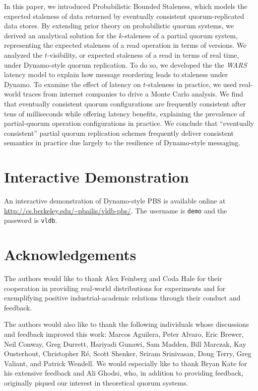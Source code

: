 \documentclass{vldb}
\begin{document}
In this paper, we introduced Probabilistic Bounded Staleness, which
models the expected staleness of data returned by eventually
consistent quorum-replicated data stores.  By extending prior theory
on probabilistic quorum systems, we derived an analytical solution for
the $k$-staleness of a partial quorum system, representing the
expected staleness of a read operation in terms of versions.  We
analyzed the $t$-visibility, or expected staleness of a read in terms
of real time, under Dynamo-style quorum replication.  To do so, we
developed the the \textit{WARS} latency model to explain how message
reordering leads to staleness under Dynamo.  To examine the effect of
latency on $t$-staleness in practice, we used real-world traces from
internet companies to drive a Monte Carlo analysis.  We find that
eventually consistent quorum configurations are frequently consistent
after tens of milliseconds while offering latency benefits, explaining
the prevalence of partial-quorum operation configurations in practice.
We conclude that ``eventually consistent'' partial quorum replication
schemes frequently deliver consistent semantics in practice due
largely to the resilience of Dynamo-style messaging.

\section*{Interactive Demonstration}

An interactive demonstration of Dynamo-style PBS is available online
at \url{http://cs.berkeley.edu/~pbailis/vldb-pbs/}.  The username is
\texttt{demo} and the password is \texttt{vldb}.

\section*{Acknowledgements}

The authors would like to thank Alex Feinberg and Coda Hale for their
cooperation in providing real-world distributions for experiments and
for exemplifying positive industrial-academic relations through their
conduct and feedback.

The authors would also like to thank the following individuals whose
discussions and feedback improved this work: Marcos Aguilera, Peter
Alvaro, Eric Brewer, Neil Conway, Greg Durrett, Hariyadi Gunawi, Sam
Madden, Bill Marczak, Kay Ousterhout, Christopher R\'e, Scott Shenker,
Sriram Srinivasan, Doug Terry, Greg Valiant, and Patrick Wendell.  We
would especially like to thank Bryan Kate for his extensive feedback
and Ali Ghodsi, who, in addition to providing feedback, originally
piqued our interest in theoretical quorum systems.
\end{document}
